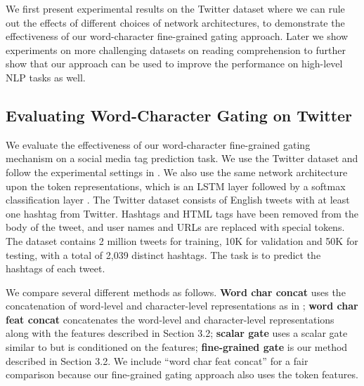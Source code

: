 \documentclass{article} \usepackage{iclr2017_conference,times}
\begin{document}
We first present experimental results on the Twitter dataset where we can rule out the effects of different choices of network architectures, to demonstrate the effectiveness of our word-character fine-grained gating approach. Later we show experiments on more challenging datasets on reading comprehension to further show that our approach can be used to improve the performance on high-level NLP tasks as well.

\subsection{Evaluating Word-Character Gating on Twitter}

We evaluate the effectiveness of our word-character fine-grained gating mechanism on a social media tag prediction task.
We use the Twitter dataset and follow the experimental settings in \cite{dhingra2016tweet2vec}. We also use the same network architecture upon the token representations, which is an LSTM layer followed by a softmax classification layer \citep{dhingra2016tweet2vec}. The Twitter dataset consists of English tweets with at least one hashtag from Twitter. Hashtags and HTML tags have been removed from the body of the tweet, and user names and URLs are replaced with special tokens. The dataset contains 2 million tweets for training, 10K for validation and 50K for testing, with a total of 2,039 distinct hashtags. The task is to predict the hashtags of each tweet.

We compare several different methods as follows.
\textbf{Word char concat} uses the concatenation of word-level and character-level representations as in \cite{yang2016multi}; \textbf{word char feat concat} concatenates the word-level and character-level representations along with the features described in Section 3.2; \textbf{scalar gate} uses a scalar gate similar to \cite{miyamoto2016gated} but is conditioned on the features; \textbf{fine-grained gate} is our method described in Section 3.2. We include “word char feat concat” for a fair comparison because our fine-grained gating approach also uses the token features.
\end{document}
